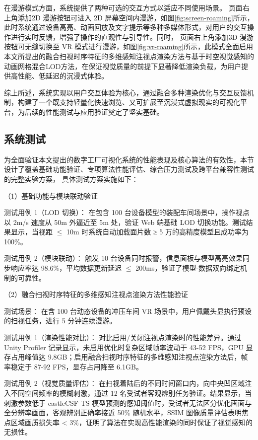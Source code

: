 在漫游模式方面，系统提供了两种可选的交互方式以适应不同使用场景。
页面右上角添加2D 漫游按钮可进入 2D 屏幕空间内漫游，如图\ref{fig:screen-roaming}所示，此时系统通过设备高亮、动画回放及文字提示等多种多媒体形式，对用户的交互操作进行实时反馈，增强了操作的直观性与引导性。同时，
页面右上角添加3D 漫游按钮可无缝切换至 VR 模式进行漫游，如图\ref{fig:vr-roaming}所示，此模式全面启用本文所提出的融合扫视时序特征的多维感知注视点渲染方法与基于时空视觉感知的动画网格混合LOD方法，在保证视觉质量的前提下显著降低渲染负载，为用户提供高性能、低延迟的沉浸式体验。



综上所述，系统实现以用户交互体验为核心，通过融合多种渲染优化与交互反馈机制，构建了一个既支持轻量化快速浏览、又可扩展至沉浸式虚拟现实的可视化平台，为后续的性能测试与应用验证奠定了坚实基础。


\subsection{系统测试}
为全面验证本文提出的数字工厂可视化系统的性能表现及核心算法的有效性，本节设计了覆盖基础功能验证、专项算法性能评估、综合压力测试及跨平台兼容性测试的完整实验方案，
具体测试方案实施如下：

（1）基础功能与模块联动验证


测试用例 1（LOD 切换）： 在包含 100 台设备模型的装配车间场景中，操作视点以 2m/s 速度从 50m 外逼近至 5m 处，验证 Web 端基础 LOD 切换功能。测试结果显示，当视距 $\le$ 10m 时系统自动加载面片数 ≥ 5 万的高精度模型且成功率为 100\%。

测试用例 2（模块联动）： 触发 10 台设备同时报警，信息面板与模型高亮效果同步响应率达 98.6\%，平均数据更新延迟 $\le$ 200ms，验证了模型-数据双向绑定机制的可靠性。


（2）融合扫视时序特征的多维感知注视点渲染方法性能验证

测试场景： 在含 100 台动态设备的冲压车间 VR 场景中，用户佩戴头显执行预设的扫视任务，进行 5 分钟连续漫游。

测试用例 1（渲染性能对比）： 对比启用/关闭注视点渲染时的性能差异。通过 Unity Profiler 记录显示，未启用优化时复杂区域帧率波动于 43-52 FPS，GPU 显存占用峰值达 9.8GB；启用融合扫视时序特征的多维感知注视点渲染方法后，帧率稳定于 87-92 FPS，显存占用降至 6.1GB。

测试用例 2（视觉质量评估）： 在扫视着陆后的不同时间窗口内，向中央凹区域注入不同空间频率的模糊刺激，通过 12 名受试者客观辨别任务验证。结果显示，当刺激参数低于 castleCSF-TS 模型预测的感知阈值时，受试者无法区分优化画面与全分辨率画面，客观辨别正确率接近 50\% 随机水平，SSIM 图像质量评估表明焦点区域画质损失率 < 3\%，证明了算法在实现高性能渲染的同时保证了视觉感知的无损性。

